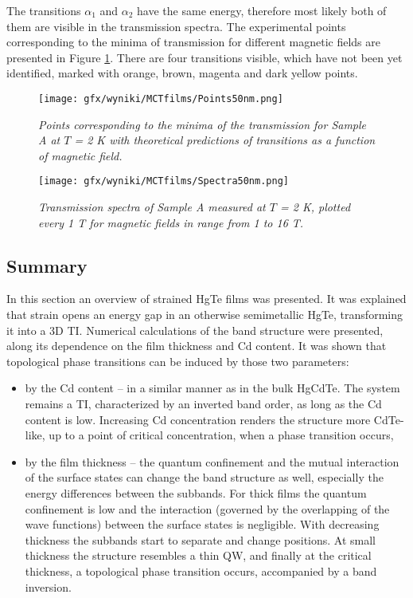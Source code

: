 \documentclass[titlepage,a4paper]{book}
\newcommand{\wciecie}{\quad\phantom{v}}
\begin{document}
The transitions $\alpha_1$ and $\alpha_2$ have the same energy, therefore most likely both of them are visible in the transmission spectra. The experimental points corresponding to the minima of transmission for different magnetic fields are presented in Figure \ref{fig:Points50nm}. There are four transitions visible, which have not been yet identified, marked with orange, brown, magenta and dark yellow points.

\begin{figure}[H]
	\centering
	\texttt{[image: gfx/wyniki/MCTfilms/Points50nm.png]}
	\vspace{-10pt}
	\caption{\textit{Points corresponding to the minima of the transmission for Sample A at $T$ = 2 K with theoretical predictions of transitions as a function of magnetic field. 
}}
	\label{fig:Points50nm}
\end{figure}
\begin{figure}[ht]
	\centering
	\texttt{[image: gfx/wyniki/MCTfilms/Spectra50nm.png]}
	\vspace{-10pt}
	\caption{\textit{Transmission spectra of Sample A measured at $T$ = 2 K, plotted every 1 T for magnetic fields in range from 1 to 16 T.}}
	\label{fig:Spectra50nm}
\end{figure}


\subsection{Summary}
\wciecie
In this section an overview of strained HgTe films was presented. It was explained that strain opens an energy gap in an otherwise semimetallic HgTe, transforming it into a 3D TI. Numerical calculations of the band structure were presented, along its dependence on the film thickness and Cd content. It was shown that topological phase transitions can be induced by those two parameters:
\begin{itemize}
\item by the Cd content -- in a similar manner as in the bulk HgCdTe. The system remains a TI, characterized by an inverted band order, as long as the Cd content is low. Increasing Cd concentration renders the structure more CdTe-like, up to a point of critical concentration, when a phase transition occurs,
\item by the film thickness -- the quantum confinement and the mutual interaction of the surface states can change the band structure as well, especially the energy differences between the subbands. For thick films the quantum confinement is low and the interaction (governed by the overlapping of the wave functions) between the surface states is negligible. With decreasing thickness the subbands start to separate and change positions. At small thickness the structure resembles a thin QW, and finally at the critical thickness, a topological phase transition occurs, accompanied by a band inversion.
\end{itemize}
\end{document}
